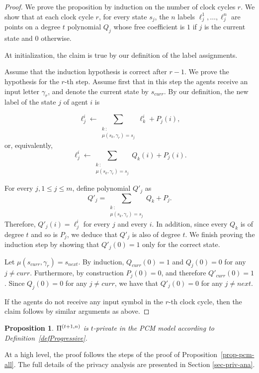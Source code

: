\documentclass[letterpaper,11pt]{article}
\newcommand{\tnPi}{{\rm {\Pi}}^{(t+1,n)}}
\newcommand{\curr}{\mathit{curr}}
\newcommand{\next}{\mathit{next}}
\newtheorem{proposition}[theorem]{Proposition}
\begin{document}
\begin {proof}
We prove the proposition by induction on the number of clock cycles $r$. We show that at each clock cycle $r$, for every state $s_j$, the $n$ labels $\ell^1_j,\ldots,\ell^n_j$ are points on a degree $t$ polynomial $Q_j$ whose free coefficient is $1$ if $j$ is the current state and $0$ otherwise.

At initialization, the 
claim is true by our definition of the label assignments. 

Assume that the induction hypothesis is correct after $r-1$. We prove
the hypothesis for the $r$-th step. Assume first that in this step the
agents receive an input letter $\gamma_r$, and denote the current
state by $s_{\curr}$. By our definition, the new label of the state $j$
of agent $i$ is

$$ \ell ^i_j \longleftarrow \sum_{\substack{k~:\\ \mu(s_k, \gamma_r)=s_j}} \ell^i_k + P_j(i),$$
\noindent or, equivalently,
$$ \ell ^i_j \longleftarrow \sum_{\substack{k~:\\ \mu(s_k, \gamma_r)=s_j}} Q_k(i) + P_j(i).$$

For every $j, 1 \leq j \leq m$, define polynomial $Q'_j$ as
$$Q'_j=\sum_{\substack{k~:\\ \mu(s_k, \gamma_r)=s_j}} Q_k + P_j.$$
Therefore, $Q'_j(i)=\ell ^i_j$ for every $j$ and every $i$. In
addition, since every $Q_k$ is of degree $t$ and so is $P_j$, we deduce
that $Q'_j$ is also of degree $t$. We finish proving the induction step by
showing that $Q'_j(0)=1$ only for the correct state.

Let $\mu(s_{\curr},\gamma_r)=s_{\next}$. By induction, $Q_{curr}(0)=1$
and $Q_j(0)=0$ for any $j \neq \curr$. Furthermore, by construction
$P_j(0)=0$, and therefore $Q'_{curr}(0)=1$. Since $Q_j(0)=0$ for any
$j \neq \curr$, we have that $Q'_j(0)=0$ for any $j \neq \next$.

If the agents do not receive any input symbol in the $r$-th clock cycle, 
then 
the claim follows by similar arguments as above.
\end {proof}



\begin{proposition}
\label{prop-pcm-tn}
$\tnPi$ is $t$-private in the PCM model according to Definition~\ref{defProgressive}.
\end{proposition}
\noindent At a high level, the proof follows the steps of the proof of 
Proposition~\ref{prop-pcm-all}. The full details of the privacy
analysis are presented in Section \ref{sec-priv-ana}.
\end{document}
